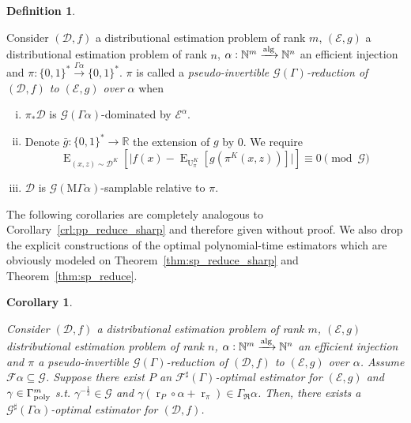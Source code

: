 \documentclass{article}
\numberwithin{equation}{section}
\theoremstyle{definition}
\newtheorem{definition}{Definition}[section]
\theoremstyle{plain}
\newtheorem{corollary}{Corollary}[section]
\newcommand{\Bool}{\{0,1\}}
\newcommand{\Words}{{\Bool^*}}
\DeclareMathOperator{\E}{E}
\DeclareMathOperator{\R}{r}
\DeclareMathOperator{\Un}{U}
\newcommand{\Nats}{\mathbb{N}}
\newcommand{\Reals}{\mathbb{R}}
\newcommand{\Abs}[1]{\lvert #1 \rvert}
\newcommand{\Dist}{\mathcal{D}}
\newcommand{\GrowR}{\Gamma_{\mathfrak{R}}}
\newcommand{\MGrow}{\mathrm{M}\Gamma}
\newcommand{\Fall}{\mathcal{F}}
\newcommand{\ESG}{\Fall^\sharp(\Gamma)}
\newcommand{\GammaPoly}{\Gamma_{\textnormal{poly}}}
\newcommand{\Alg}{\xrightarrow{\textnormal{alg}}}
\begin{document}
\begin{samepage}
\begin{definition}
\label{def:p_reduce}

Consider $(\Dist,f)$ a distributional estimation problem of rank ${m}$, $(\mathcal{E},g)$ a distributional estimation problem of rank ${n}$, ${\alpha: \Nats^m \Alg \Nats^n}$ an efficient injection and ${\pi: \Words \xrightarrow{\Gamma \alpha} \Words}$. $\pi$ is called a \emph{pseudo-invertible $\mathcal{G}(\Gamma)$-reduction of $(\Dist,f)$ to $(\mathcal{E},g)$ over ${\alpha}$} when

\begin{enumerate}[(i)]

\item\label{con:def__p_reduce__dist} ${\pi_*\Dist}$ is ${\mathcal{G}(\Gamma \alpha)}$-dominated by ${\mathcal{E}^\alpha}$.

\item\label{con:def__p_reduce__fun} Denote ${\bar{g}: \Words \rightarrow \Reals}$ the extension of $g$ by 0. We require \[\E_{(x,z) \sim \Dist^{K}}[\Abs{f(x)-\E_{\Un_\pi^{K}}[g(\pi^{K}(x,z))]}] \equiv 0 \pmod{\mathcal{G}}\]

\item\label{con:def__p_reduce__smp} $\Dist$ is $\mathcal{G}(\MGrow \alpha)$-samplable relative to $\pi$.

\end{enumerate}

\end{definition}
\end{samepage}

The following corollaries are completely analogous to Corollary~\ref{crl:pp_reduce_sharp} and therefore given without proof. We also drop the explicit constructions of the optimal polynomial-time estimators which are obviously modeled on Theorem~\ref{thm:sp_reduce_sharp} and Theorem~\ref{thm:sp_reduce}.

\begin{samepage}
\begin{corollary}
\label{crl:p_reduce_sharp}

Consider $(\Dist,f)$ a distributional estimation problem of rank ${m}$, $(\mathcal{E},g)$ distributional estimation problem of rank ${n}$, ${\alpha: \Nats^m \Alg \Nats^n}$ an efficient injection and $\pi$ a pseudo-invertible $\mathcal{G}(\Gamma)$-reduction of $(\Dist, f)$ to $(\mathcal{E}, g)$ over ${\alpha}$. Assume ${\Fall\alpha \subseteq \mathcal{G}}$. Suppose there exist ${P}$ an $\ESG$-optimal estimator for $(\mathcal{E}, g)$ and ${\gamma \in \GammaPoly^m}$ s.t. ${\gamma^{-\frac{1}{2}} \in \mathcal{G}}$ and ${\gamma(\R_P \circ \alpha + \R_\pi) \in \GrowR \alpha}$. Then, there exists a $\mathcal{G}^\sharp (\Gamma \alpha)$-optimal estimator for $(\Dist, f)$.


\end{corollary}
\end{samepage}
\end{document}
